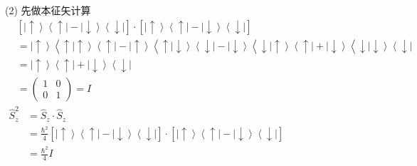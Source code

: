 \begin{frame}[label=current]
  \frametitle{}
(2) 先做本征矢计算
\[ \begin{aligned}
  &\left[\left\vert \uparrow \right\rangle\left\langle  \uparrow\right\vert - \left\vert \downarrow \right\rangle\left\langle  \downarrow\right\vert\right]\cdot \left[\left\vert \uparrow \right\rangle\left\langle  \uparrow\right\vert - \left\vert \downarrow \right\rangle\left\langle \downarrow\right\vert\right] \\
  &= \left\vert \uparrow \right\rangle\left\langle  \uparrow\left\vert \uparrow \right\rangle\left\langle  \uparrow\right\vert\right. 
  - \left\vert \uparrow \right\rangle\left\langle \uparrow \left\vert \downarrow \right\rangle\left\langle  \downarrow\right\vert\right. 
  - \left\vert \downarrow \right\rangle\left\langle \downarrow \left\vert \uparrow \right\rangle\left\langle  \uparrow\right\vert\right.
  + \left\vert \downarrow \right\rangle\left\langle \downarrow \left\vert \downarrow \right\rangle\left\langle \downarrow\right\vert\right. \\
  &=\left\vert \uparrow \right\rangle\left\langle  \uparrow\right\vert + \left\vert \downarrow \right\rangle\left\langle  \downarrow\right\vert  \\
  &= \begin{pmatrix}
    1 & 0\\
    0 & 1
   \end{pmatrix} =I 
\end{aligned}\]
\[ \begin{aligned}\hat{S}^2_z &= \hat{S}_z\cdot\hat{S}_z \\
  &= \frac{\hbar^2}{4} \left[\left\vert \uparrow \right\rangle\left\langle  \uparrow\right\vert - \left\vert \downarrow \right\rangle\left\langle  \downarrow\right\vert\right]\cdot \left[\left\vert \uparrow \right\rangle\left\langle  \uparrow\right\vert - \left\vert \downarrow \right\rangle\left\langle \downarrow\right\vert\right] ~\qquad \qquad \qquad \quad \qquad\\
  &= \frac{\hbar^2}{4} I \end{aligned}\]
\end{frame} 

